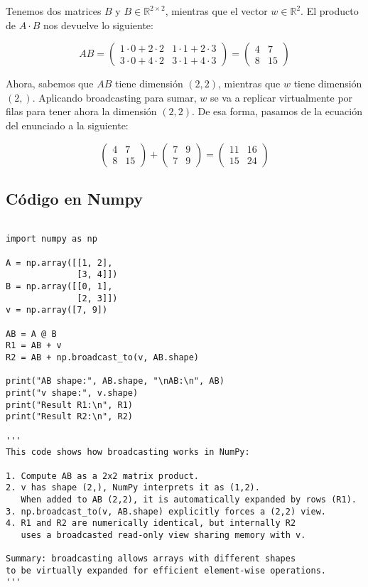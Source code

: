 Tenemos dos matrices $B$ y $B \in \mathbb{R}^{2 \times 2}$, mientras que el vector $w \in \mathbb{R}^2$.
El producto de $A \cdot B$ nos devuelve lo siguiente:

\[
    AB = \begin{pmatrix} 1 \cdot 0 + 2 \cdot 2 & 1 \cdot 1 + 2 \cdot 3\\
                         3 \cdot 0 + 4 \cdot 2 & 3 \cdot 1 + 4 \cdot 3 \end{pmatrix} = \begin{pmatrix}
                            4 & 7 \\
                            8 & 15   
                         \end{pmatrix}
\]

Ahora, sabemos que $AB$ tiene dimensión $(2,2)$, mientras que $w$ tiene 
dimensión $(2,)$. Aplicando broadcasting para sumar, $w$ se va a replicar virtualmente por filas para
tener ahora la dimensión $(2,2)$. De esa forma, pasamos de la ecuación del enunciado a la siguiente:

\[
  \begin{pmatrix} 4 & 7 \\ 8 & 15 \end{pmatrix} + 
  \begin{pmatrix} 7 & 9 \\ 7 & 9 \end{pmatrix} =
  \begin{pmatrix} 11 & 16 \\ 15 & 24 \end{pmatrix}
\]  

\clearpage

\subsection{Código en Numpy}

\begin{lstlisting}[caption={La descripción del código fue generada con ayuda de GPT}, label={lst:broadcasting}]

import numpy as np

A = np.array([[1, 2],
              [3, 4]])
B = np.array([[0, 1],
              [2, 3]])
v = np.array([7, 9])        

AB = A @ B                  
R1 = AB + v                 
R2 = AB + np.broadcast_to(v, AB.shape)   

print("AB shape:", AB.shape, "\nAB:\n", AB)
print("v shape:", v.shape)
print("Result R1:\n", R1)
print("Result R2:\n", R2)

'''
This code shows how broadcasting works in NumPy:

1. Compute AB as a 2x2 matrix product.
2. v has shape (2,), NumPy interprets it as (1,2). 
   When added to AB (2,2), it is automatically expanded by rows (R1).
3. np.broadcast_to(v, AB.shape) explicitly forces a (2,2) view.
4. R1 and R2 are numerically identical, but internally R2 
   uses a broadcasted read-only view sharing memory with v.

Summary: broadcasting allows arrays with different shapes 
to be virtually expanded for efficient element-wise operations.
'''
\end{lstlisting}



